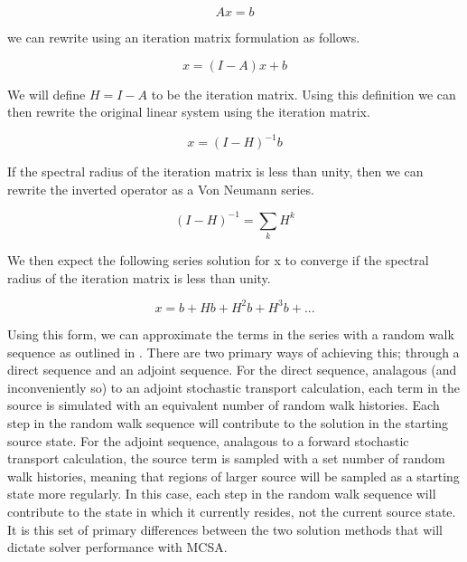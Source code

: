 \documentclass[note]{TechNote}
\begin{document}
\begin{equation}
  A x = b
  \label{eq:linear_system}
\end{equation}

we can rewrite using an iteration matrix formulation as follows.

\begin{equation}
  x = (I-A) x + b
  \label{eq:iteration_form}
\end{equation}

We will define $H=I-A$ to be the iteration matrix. Using this
definition we can then rewrite the original linear system using the
iteration matrix.

\begin{equation}
  x = (I-H)^{-1} b
  \label{eq:iteration_form2}
\end{equation}

If the spectral radius of the iteration matrix is less than unity,
then we can rewrite the inverted operator as a Von Neumann series.

\begin{equation}
  (I-H)^{-1} = \sum_k H^k
  \label{eq:von_neumann_series}
\end{equation}

We then expect the following series solution for x to converge if the
spectral radius of the iteration matrix is less than unity.

\begin{equation}
  x = b + H b + H^2 b + H^3 b + ...
  \label{eq:series_solution}
\end{equation}

Using this form, we can approximate the terms in the series with a
random walk sequence as outlined in \cite{Hammersley_1964}. There are
two primary ways of achieving this; through a direct sequence and an
adjoint sequence. For the direct sequence, analagous (and
inconveniently so) to an adjoint stochastic transport calculation,
each term in the source is simulated with an equivalent number of
random walk histories. Each step in the random walk sequence will
contribute to the solution in the starting source state. For the
adjoint sequence, analagous to a forward stochastic transport
calculation, the source term is sampled with a set number of random
walk histories, meaning that regions of larger source will be sampled
as a starting state more regularly. In this case, each step in the
random walk sequence will contribute to the state in which it
currently resides, not the current source state. It is this set of
primary differences between the two solution methods that will dictate
solver performance with MCSA.
\end{document}
